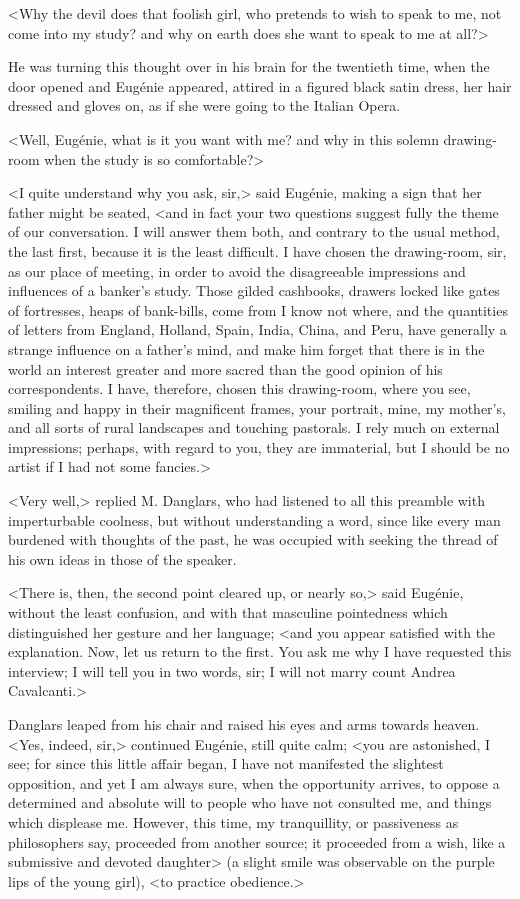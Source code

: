  <Why the devil does that foolish girl, who pretends to wish to speak to me, not come into my study? and why on earth does she want to speak to me at all?> 

 He was turning this thought over in his brain for the twentieth time, when the door opened and Eugénie appeared, attired in a figured black satin dress, her hair dressed and gloves on, as if she were going to the Italian Opera. 

 <Well, Eugénie, what is it you want with me? and why in this solemn drawing-room when the study is so comfortable?> 

 <I quite understand why you ask, sir,> said Eugénie, making a sign that her father might be seated, <and in fact your two questions suggest fully the theme of our conversation. I will answer them both, and contrary to the usual method, the last first, because it is the least difficult. I have chosen the drawing-room, sir, as our place of meeting, in order to avoid the disagreeable impressions and influences of a banker's study. Those gilded cashbooks, drawers locked like gates of fortresses, heaps of bank-bills, come from I know not where, and the quantities of letters from England, Holland, Spain, India, China, and Peru, have generally a strange influence on a father's mind, and make him forget that there is in the world an interest greater and more sacred than the good opinion of his correspondents. I have, therefore, chosen this drawing-room, where you see, smiling and happy in their magnificent frames, your portrait, mine, my mother's, and all sorts of rural landscapes and touching pastorals. I rely much on external impressions; perhaps, with regard to you, they are immaterial, but I should be no artist if I had not some fancies.> 

 <Very well,> replied M. Danglars, who had listened to all this preamble with imperturbable coolness, but without understanding a word, since like every man burdened with thoughts of the past, he was occupied with seeking the thread of his own ideas in those of the speaker. 

 <There is, then, the second point cleared up, or nearly so,> said Eugénie, without the least confusion, and with that masculine pointedness which distinguished her gesture and her language; <and you appear satisfied with the explanation. Now, let us return to the first. You ask me why I have requested this interview; I will tell you in two words, sir; I will not marry count Andrea Cavalcanti.> 

 Danglars leaped from his chair and raised his eyes and arms towards heaven.  <Yes, indeed, sir,> continued Eugénie, still quite calm; <you are astonished, I see; for since this little affair began, I have not manifested the slightest opposition, and yet I am always sure, when the opportunity arrives, to oppose a determined and absolute will to people who have not consulted me, and things which displease me. However, this time, my tranquillity, or passiveness as philosophers say, proceeded from another source; it proceeded from a wish, like a submissive and devoted daughter> (a slight smile was observable on the purple lips of the young girl), <to practice obedience.> 

